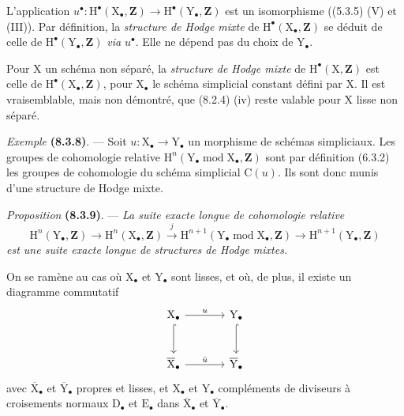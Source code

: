 \documentclass[11pt,leqno]{article}
\begin{document}
L’application \(u^\bullet:\mathrm{H}^\bullet(\mathrm{X}_\bullet,\mathbf{Z})\to\mathrm{H}^\bullet(\mathrm{Y}_\bullet,\mathbf{Z})\) est un isomorphisme ((5.3.5) (V) et (III)). Par définition, la \textit{structure de Hodge mixte} de \(\mathrm{H}^\bullet(\mathrm{X}_\bullet,\mathbf{Z})\) se déduit de celle de \(\mathrm{H}^\bullet(\mathrm{Y}_\bullet,\mathbf{Z})\) \textit{via} \(u^\bullet\). Elle ne dépend pas du choix de \(\mathrm{Y}_\bullet\).

Pour \(\mathrm{X}\) un schéma non séparé, la \textit{structure de Hodge mixte} de \(\mathrm{H}^\bullet(\mathrm{X},\mathbf{Z})\) est celle de \(\mathrm{H}^\bullet(\mathrm{X}_\bullet,\mathbf{Z})\), pour \(\mathrm{X}_\bullet\) le schéma simplicial constant défini par \(\mathrm{X}\). Il est vraisemblable, mais non démontré, que (8.2.4) (iv) reste valable pour \(\mathrm{X}\) lisse non séparé.

\textit{Exemple} \textbf{(8.3.8)}. — Soit \(u:\mathrm{X}_\bullet\to\mathrm{Y}_\bullet\) un morphisme de schémas simpliciaux. Les groupes de cohomologie relative \(\mathrm{H}^n(\mathrm{Y}_\bullet\operatorname{mod}\mathrm{X}_\bullet,\mathbf{Z})\) sont par définition (6.3.2) les groupes de cohomologie du schéma simplicial \(\mathrm{C}(u)\). Ils sont donc munis d’une structure de Hodge mixte.

\textit{Proposition} \textbf{(8.3.9)}. — \textit{La suite exacte longue de cohomologie relative}
\[
\mathrm{H}^n(\mathrm{Y}_\bullet,\mathbf{Z})
\to\mathrm{H}^n(\mathrm{X}_\bullet,\mathbf{Z})
\xrightarrow{j}
\mathrm{H}^{n+1}(\mathrm{Y}_\bullet\operatorname{mod}\mathrm{X}_\bullet,\mathbf{Z})
\to\mathrm{H}^{n+1}(\mathrm{Y}_\bullet,\mathbf{Z})
\]
\textit{est une suite exacte longue de structures de Hodge mixtes.}

On se ramène au cas où \(\mathrm{X}_\bullet\) et \(\mathrm{Y}_\bullet\) sont lisses, et où, de plus, il existe un diagramme commutatif
\[
\begin{tikzcd}[column sep=large,row sep=large]
\mathrm{X}_\bullet \arrow[r,"u"] \arrow[d,hook]
 & \mathrm{Y}_\bullet \arrow[d,hook]\\
\overline{\mathrm{X}}_\bullet \arrow[r,"\bar{u}"]
 & \overline{\mathrm{Y}}_\bullet
\end{tikzcd}
\]
avec \(\overline{\mathrm{X}}_\bullet\) et \(\overline{\mathrm{Y}}_\bullet\) propres et lisses, et \(\mathrm{X}_\bullet\) et \(\mathrm{Y}_\bullet\) compléments de diviseurs à croisements normaux \(\mathrm{D}_\bullet\) et \(\mathrm{E}_\bullet\) dans \(\overline{\mathrm{X}}_\bullet\) et \(\overline{\mathrm{Y}}_\bullet\).
\end{document}
